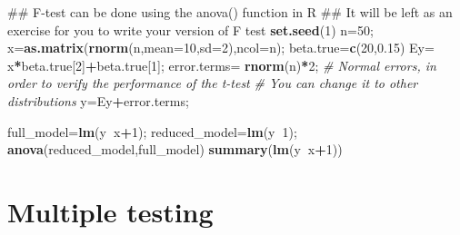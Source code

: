 \documentclass[12pt,]{book}
\newenvironment{Shaded}{\begin{snugshade}}{\end{snugshade}}
\newcommand{\KeywordTok}[1]{\textcolor[rgb]{0.13,0.29,0.53}{\textbf{#1}}}
\newcommand{\DataTypeTok}[1]{\textcolor[rgb]{0.13,0.29,0.53}{#1}}
\newcommand{\DecValTok}[1]{\textcolor[rgb]{0.00,0.00,0.81}{#1}}
\newcommand{\FloatTok}[1]{\textcolor[rgb]{0.00,0.00,0.81}{#1}}
\newcommand{\StringTok}[1]{\textcolor[rgb]{0.31,0.60,0.02}{#1}}
\newcommand{\CommentTok}[1]{\textcolor[rgb]{0.56,0.35,0.01}{\textit{#1}}}
\newcommand{\OperatorTok}[1]{\textcolor[rgb]{0.81,0.36,0.00}{\textbf{#1}}}
\newcommand{\NormalTok}[1]{#1}
\begin{document}
\begin{Shaded}
\begin{Highlighting}[]
\NormalTok{## F-test can be done using the anova() function in R}
\NormalTok{## It will be left as an exercise for you to write your version of F test}
\KeywordTok{set.seed}\NormalTok{(}\DecValTok{1}\NormalTok{)}
\NormalTok{n=}\DecValTok{50}\NormalTok{;}
\NormalTok{x=}\KeywordTok{as.matrix}\NormalTok{(}\KeywordTok{rnorm}\NormalTok{(n,}\DataTypeTok{mean=}\DecValTok{10}\NormalTok{,}\DataTypeTok{sd=}\DecValTok{2}\NormalTok{),}\DataTypeTok{ncol=}\NormalTok{n);}
\NormalTok{beta.true=}\KeywordTok{c}\NormalTok{(}\DecValTok{20}\NormalTok{,}\FloatTok{0.15}\NormalTok{)}
\NormalTok{Ey=}\StringTok{ }\NormalTok{x}\OperatorTok{*}\NormalTok{beta.true[}\DecValTok{2}\NormalTok{]}\OperatorTok{+}\NormalTok{beta.true[}\DecValTok{1}\NormalTok{];}
\NormalTok{error.terms=}\StringTok{ }\KeywordTok{rnorm}\NormalTok{(n)}\OperatorTok{*}\DecValTok{2}\NormalTok{; }\CommentTok{# Normal errors, in order to verify the performance of the t-test }
\CommentTok{# You can change it to other distributions }
\NormalTok{y=Ey}\OperatorTok{+}\NormalTok{error.terms;}

\NormalTok{full_model=}\KeywordTok{lm}\NormalTok{(y}\OperatorTok{~}\NormalTok{x}\OperatorTok{+}\DecValTok{1}\NormalTok{);}
\NormalTok{reduced_model=}\KeywordTok{lm}\NormalTok{(y}\OperatorTok{~}\DecValTok{1}\NormalTok{);}
\KeywordTok{anova}\NormalTok{(reduced_model,full_model)}
\KeywordTok{summary}\NormalTok{(}\KeywordTok{lm}\NormalTok{(y}\OperatorTok{~}\NormalTok{x}\OperatorTok{+}\DecValTok{1}\NormalTok{))}
\end{Highlighting}
\end{Shaded}

\section{Multiple testing}\label{multiple-testing}
\end{document}
